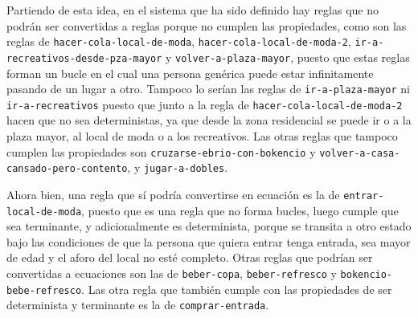 \documentclass[a4paper,11pt]{report}
\begin{document}
  Partiendo de esta idea, en el sistema que ha sido definido hay reglas que
  no podrán ser convertidas a reglas porque no cumplen las propiedades, como
  son las reglas de \texttt{hacer-cola-local-de-moda}, \texttt{hacer-cola-local-de-moda-2},
  \texttt{ir-a-recreativos-desde-pza-mayor} y \texttt{volver-a-plaza-mayor}, puesto
  que estas reglas forman un bucle en el cual una persona genérica puede estar
  infinitamente pasando de un lugar a otro. Tampoco lo serían las reglas de
  \texttt{ir-a-plaza-mayor} ni \texttt{ir-a-recreativos} puesto que junto a la
  regla de \texttt{hacer-cola-local-de-moda-2} hacen que no sea deterministas, ya
  que desde la zona residencial se puede ir o a la plaza mayor, al local de moda
  o a los recreativos. Las otras reglas que tampoco cumplen las propiedades son
  \texttt{cruzarse-ebrio-con-bokencio} y \texttt{volver-a-casa-cansado-pero-contento},
  y \texttt{jugar-a-dobles}.

  Ahora bien, una regla que sí podría convertirse en ecuación es la de
  \texttt{entrar-local-de-moda}, puesto que es una regla que no forma bucles,
  luego cumple que sea terminante, y adicionalmente es determinista, porque
  se transita a otro estado bajo las condiciones de que la persona que quiera
  entrar tenga entrada, sea mayor de edad y el aforo del local no esté completo.
  Otras reglas que podrían ser convertidas a ecuaciones son las de \texttt{beber-copa},
  \texttt{beber-refresco} y \texttt{bokencio-bebe-refresco}. Las otra regla que
  también cumple con las propiedades de ser determinista y terminante es la
  de \texttt{comprar-entrada}.
\end{document}
